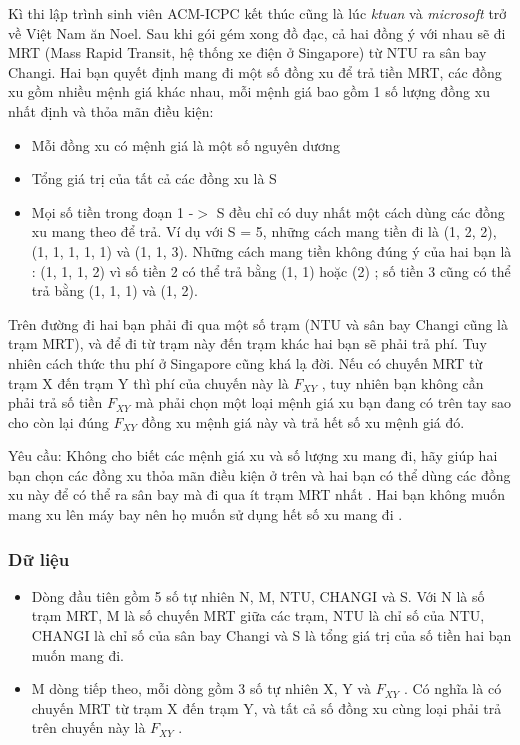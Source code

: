 



   Kì thi lập trình sinh viên ACM-ICPC kết thúc cũng là lúc   \textit{    ktuan   }   và   \textit{    microsoft   }   trở về Việt Nam ăn Noel. Sau khi gói gém xong đồ đạc, cả hai đồng ý với nhau sẽ đi MRT (Mass Rapid Transit, hệ thống xe điện ở Singapore) từ NTU ra sân bay Changi. Hai bạn quyết định mang đi một số đồng xu để trả tiền MRT, các đồng xu gồm nhiều mệnh giá khác nhau, mỗi mệnh giá bao gồm 1 số lượng đồng xu nhất định và thỏa mãn điều kiện:  
\begin{itemize}
	\item     Mỗi đồng xu có mệnh giá là một số nguyên dương   
	\item     Tổng giá trị của tất cả các đồng xu là S   
	\item     Mọi số tiền trong đoạn 1 -$>$ S đều chỉ có duy nhất một cách dùng các đồng xu mang theo để trả. Ví dụ với S = 5, những cách mang tiền đi là (1, 2, 2), (1, 1, 1, 1, 1) và (1, 1, 3). Những cách mang tiền không đúng ý của hai bạn là : (1, 1, 1, 2) vì số tiền 2 có thể trả bằng (1, 1) hoặc (2) ; số tiền 3 cũng có thể trả bằng (1, 1, 1) và (1, 2).   
\end{itemize}

   Trên đường đi hai bạn phải đi qua một số trạm (NTU và sân bay Changi cũng là trạm MRT), và để đi từ trạm này đến trạm khác hai bạn sẽ phải trả phí. Tuy nhiên cách thức thu phí ở Singapore cũng khá lạ đời. Nếu có chuyến MRT từ trạm X đến trạm Y thì phí của chuyến này là $F_{XY}$   , tuy nhiên bạn không cần phải trả số tiền $F_{XY}$   mà       phải chọn một loại mệnh giá xu         bạn đang có        trên tay sao cho còn lại đúng $F_{XY}$    đồng xu mệnh giá này và trả hết số xu mệnh giá đó.     

       Yêu cầu:      Không cho biết các mệnh giá xu và số lượng xu mang đi, hãy giúp hai bạn chọn các đồng xu       thỏa mãn điều kiện ở trên      và hai bạn có thể dùng các đồng xu này để       có thể ra sân bay      mà       đi qua ít trạm MRT nhất      . Hai bạn không muốn mang xu lên máy bay nên họ muốn       sử dụng hết số xu mang đi      .  

\subsubsection{   Dữ liệu  }
\begin{itemize}
	\item     Dòng đầu tiên gồm 5 số tự nhiên N, M, NTU, CHANGI và S. Với N là số trạm MRT, M là số chuyến MRT giữa các trạm, NTU là chỉ số của NTU, CHANGI là chỉ số của sân bay Changi và S là tổng giá trị của số tiền hai bạn muốn mang đi.   
	\item     M dòng tiếp theo, mỗi dòng gồm 3 số tự nhiên X, Y và $F_{XY}$    . Có nghĩa là có chuyến MRT từ trạm X đến trạm Y, và tất cả số đồng xu cùng loại phải trả trên chuyến này là $F_{XY}$    .   
\end{itemize}

